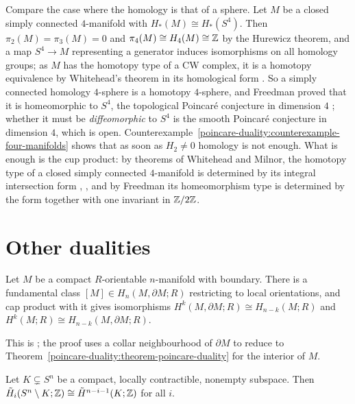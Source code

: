 \begin{remark}\label{poincare-duality:remark-poincare-conjecture}
Compare the case where the homology is that of a sphere. Let $M$ be a closed simply connected $4$-manifold with $H_*(M) \cong H_*(S^4)$. Then $\pi_2(M) = \pi_3(M) = 0$
and $\pi_4(M) \cong H_4(M) \cong \mathbb{Z}$ by the Hurewicz theorem, and a map $S^4 \to M$ representing a generator induces isomorphisms on all homology groups; as $M$ has the
homotopy type of a CW complex, it is a homotopy equivalence by Whitehead's theorem in its homological form \cite[Section 4.2 and Appendix]{hatcher-at}. So a
simply connected homology $4$-sphere is a homotopy $4$-sphere, and Freedman proved that it is homeomorphic to $S^4$, the topological Poincar\'e conjecture in
dimension $4$ \cite{freedman-1982}; whether it must be \emph{diffeomorphic} to $S^4$ is the smooth Poincar\'e conjecture in dimension $4$, which is open.
Counterexample~\ref{poincare-duality:counterexample-four-manifolds} shows that as soon as $H_2 \neq 0$ homology is not enough. What is enough is the cup product:
by theorems of Whitehead and Milnor, the homotopy type of a closed simply connected $4$-manifold is determined by its integral intersection form
\cite{whitehead-1949}, \cite{milnor-1958}, and by Freedman its homeomorphism type is determined by the form together with one invariant in $\mathbb{Z}/2\mathbb{Z}$.
\end{remark}

\section{Other dualities}\label{poincare-duality:section-other-dualities}

\begin{theorem}\label{poincare-duality:theorem-lefschetz-duality}
Let $M$ be a compact $R$-orientable $n$-manifold with boundary. There is a fundamental class $[M] \in H_n(M, \partial M; R)$ restricting to local orientations, and cap product with it
gives isomorphisms $H^k(M, \partial M; R) \cong H_{n-k}(M; R)$ and $H^k(M; R) \cong H_{n-k}(M, \partial M; R)$.
\end{theorem}

This is \cite[Theorem 3.43]{hatcher-at}; the proof uses a collar neighbourhood of $\partial M$ to reduce to Theorem~\ref{poincare-duality:theorem-poincare-duality} for the
interior of $M$.

\begin{theorem}\label{poincare-duality:theorem-alexander-duality}
Let $K \subsetneq S^n$ be a compact, locally contractible, nonempty subspace. Then $\tilde{H}_i(S^n \setminus K; \mathbb{Z}) \cong \tilde{H}^{n-i-1}(K; \mathbb{Z})$ for all $i$.
\end{theorem}

